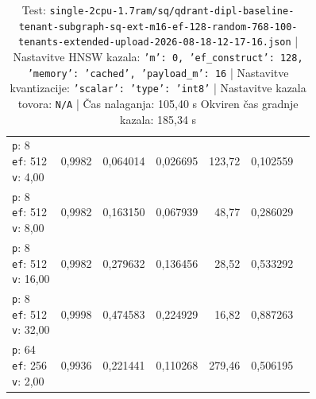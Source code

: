 \begin{table}[htbp]
\begin{tabularx}{\textwidth}{Xrrrrrr}
    \makecell{\texttt{p}: 8\\\texttt{ef}: 512\\\texttt{v}: 4,00} & 0,9982 & 0,064014 & 0,026695 & 123,72 & 0,102559 \\
    \makecell{\texttt{p}: 8\\\texttt{ef}: 512\\\texttt{v}: 8,00} & 0,9982 & 0,163150 & 0,067939 & 48,77 & 0,286029 \\
    \makecell{\texttt{p}: 8\\\texttt{ef}: 512\\\texttt{v}: 16,00} & 0,9982 & 0,279632 & 0,136456 & 28,52 & 0,533292 \\
    \makecell{\texttt{p}: 8\\\texttt{ef}: 512\\\texttt{v}: 32,00} & 0,9998 & 0,474583 & 0,224929 & 16,82 & 0,887263 \\
    \makecell{\texttt{p}: 64\\\texttt{ef}: 256\\\texttt{v}: 2,00} & 0,9936 & 0,221441 & 0,110268 & 279,46 & 0,506195 \\
    \bottomrule
  \end{tabularx}
\caption* {Test: \texttt{single-2cpu-1.7ram/sq/qdrant-dipl-baseline-tenant-subgraph-sq-ext-m16-ef-128-random-768-100-tenants-extended-upload-2026-08-18-12-17-16.json} | Nastavitve HNSW kazala: \texttt{{'m': 0, 'ef\_construct': 128, 'memory': 'cached', 'payload\_m': 16}} | Nastavitve kvantizacije: \texttt{{'scalar': {'type': 'int8'}}} | Nastavitve kazala tovora: \texttt{N/A} | Čas nalaganja: 105,40 s Okviren čas gradnje kazala: 185,34 s}\end{table}


